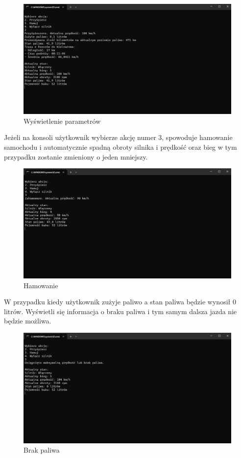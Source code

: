 \begin{figure}[!ht]
	\centering
		\includegraphics[width=17cm]{Parametry.png}
	\caption{\footnotesize Wyświetlenie parametrów}
	\label{fig:plotend}
\end{figure}

Jeżeli na konsoli użytkownik wybierze akcję numer 3, spowoduje hamowanie samochodu i automatycznie spadną obroty silnika i prędkość oraz bieg w tym przypadku zostanie zmieniony o jeden mniejszy. 

\begin{figure}[!ht]
	\centering
		\includegraphics[width=17cm]{Hamowanie.png}
	\caption{\footnotesize Hamowanie}
	\label{fig:plotend}
\end{figure}
\newpage
W przypadku kiedy użytkownik zużyje paliwo a stan paliwa będzie wynosił 0 litrów. Wyświetli się informacja o braku paliwa i tym samym dalsza jazda nie będzie możliwa.

\begin{figure}[!ht]
	\centering
		\includegraphics[width=17cm]{Brak paliwa.png}
	\caption{\footnotesize Brak paliwa}
	\label{fig:plotend}
\end{figure}

